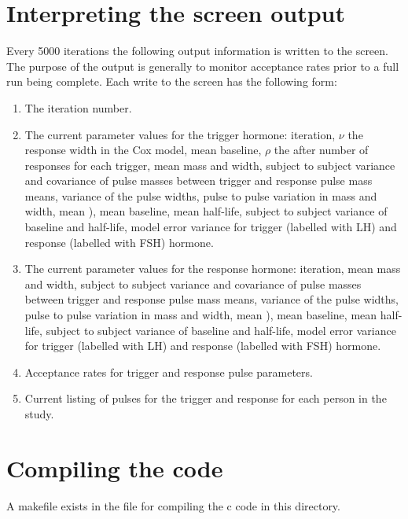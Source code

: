 \documentclass[12pt, oneside]{article}   	%
\begin{document}
\section{Interpreting the screen output}
Every 5000 iterations the following output information is written to the screen. The purpose of the output is generally to monitor acceptance rates prior to a full run being complete.  Each write to the screen has the following form:
\begin{enumerate}
\item The iteration number.
\item The current parameter values for the trigger hormone:  iteration, $\nu$ the response width in the Cox model, mean baseline, $\rho$ the after number of responses for each trigger, mean mass and width, subject to subject variance and covariance of pulse masses between trigger and response pulse mass means, variance of the pulse widths, pulse to pulse variation in mass and width, mean ),  mean baseline, mean half-life, subject to subject variance of baseline and half-life, model error variance for trigger (labelled with LH) and response (labelled with FSH) hormone.
\item The current parameter values for the response hormone:  iteration, mean mass and width, subject to subject variance and covariance of pulse masses between trigger and response pulse mass means, variance of the pulse widths, pulse to pulse variation in mass and width, mean ),  mean baseline, mean half-life, subject to subject variance of baseline and half-life, model error variance for trigger (labelled with LH) and response (labelled with FSH) hormone.
\item Acceptance rates for trigger and response pulse parameters.
\item Current listing of pulses for the trigger and response for each person in the study.
\end{enumerate}


\section{Compiling the code}
A makefile exists in the file for compiling the c code in this directory.
\end{document}
